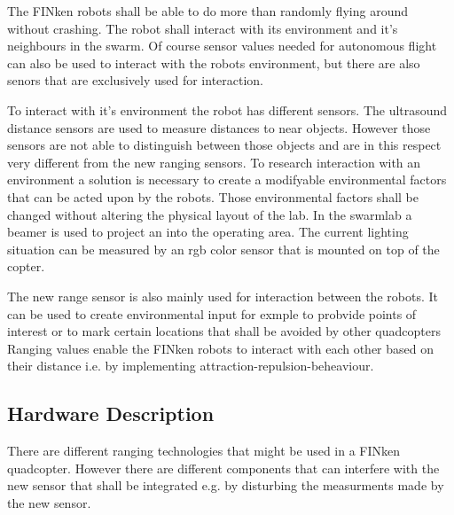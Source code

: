 The FINken robots shall be able to do more than randomly flying around without crashing.
The robot shall interact with its environment and it's neighbours in the swarm.
Of course sensor values needed for autonomous flight can also be used to interact with the robots environment, but there are also senors that are exclusively used for interaction.

To interact with it's environment the robot has different sensors.
The ultrasound distance sensors are used to measure distances to near objects.
However those sensors are not able to distinguish between those objects and are in this respect very different from the new ranging sensors.
To research interaction with an environment a solution is necessary to create a modifyable environmental factors that can be acted upon by the robots.
Those environmental factors shall be changed without altering the physical layout of the lab.
In the swarmlab a beamer is used to project an into the operating area.
The current lighting situation can be measured by an rgb color sensor that is mounted on top of the copter.

The new range sensor is also mainly used for interaction between the robots.
It can be used to create environmental input for exmple to probvide points of interest or to mark certain locations that shall be avoided by other quadcopters
Ranging values enable the FINken robots to interact with each other based on their distance i.e. by implementing attraction-repulsion-beheaviour.


\subsection{Hardware Description}
There are different ranging technologies that might be used in a FINken quadcopter.
However there are different components that can interfere with the new sensor that shall be integrated e.g. by disturbing the measurments made by the new sensor.

